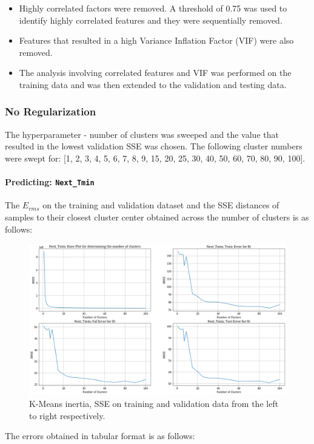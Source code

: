 \documentclass[12pt,a4paper]{article}
\newcommand{\noi}{\noindent}
\def\tt#1{\texttt{#1}}
\begin{document}
\begin{itemize}
    \item Highly correlated factors were removed. A threshold of 0.75 was used to identify highly correlated features and they were sequentially removed.
    \item Features that resulted in a high Variance Inflation Factor (VIF) were also removed.
    \item The analysis involving correlated features and VIF was performed on the training data and was then extended to the validation and testing data. 
\end{itemize}


\subsubsection{No Regularization}
The hyperparameter - number of clusters was sweeped and the value that resulted in the lowest validation SSE was chosen. The following cluster numbers were swept for: [1, 2, 3, 4, 5, 6, 7, 8, 9, 15, 20, 25, 30, 40, 50, 60, 70, 80, 90, 100].

\paragraph{Predicting: \tt{Next\_Tmin}}
The $E_{rms}$ on the training and validation dataset and the SSE distances of samples to their closest cluster center obtained across the number of clusters is as follows:
\begin{figure}[H]
     \centering
     \includegraphics[scale=0.4]{images/t3_d3/no_reg/tmin_errors.png}
     \caption{K-Means inertia, SSE on training and validation data from the left to right respectively.}
\end{figure}

\vspace{-1em}
\noi
The errors obtained in tabular format is as follows:

\end{document}
